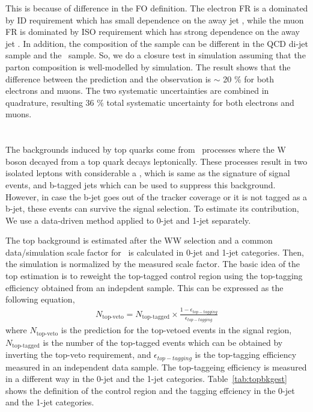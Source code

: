 This is because of difference in the FO definition. The electron FR is a
dominated by ID requirement which has small dependence on the away jet \pt, 
while the muon FR is dominated by ISO requirement which has strong dependence 
on the away jet \pt.
In addition, the composition of the sample can be different in the QCD di-jet sample 
and the \Wjets\ sample. So, we do a closure test in simulation 
assuming that the parton composition is well-modelled by simulation. 
The result shows that the difference between 
the prediction and the observation is $\sim$ 20 \% for both electrons and muons.
The two systematic uncertainties are combined in quadrature, resulting 
36 \% total systematic uncertainty for both electrons and muons. 
\section{ \topbkg }

The backgrounds induced by top quarks come from \topbkg\ processes where 
the W boson decayed from a top quark decays leptonically. These processes 
result in two isolated leptons with considerable a \met, which is 
same as the signature of signal events, and b-tagged jets which
can be used to suppress this background. However, in case the b-jet 
goes out of the tracker coverage or it is not tagged as a b-jet, 
these events can survive the signal selection. To estimate its 
contribution, We use a data-driven method applied to 0-jet and 1-jet separately.

The top background is estimated after the WW selection and a common 
data/simulation scale factor for \topbkg\ is calculated in 0-jet and 1-jet 
categories. Then, the simulation is normalized by the measured scale factor. 
The basic idea of the top estimation is to reweight the top-tagged control region 
using the top-tagging efficiency obtained from an indepdent sample. This 
can be expressed as the following equation, 
\begin{eqnarray} 
N_\textrm{top-veto} 
= 
N_{\textrm{top-tagged}} \times
\frac{1 - \epsilon_{top-tagging}}{\epsilon_{top-tagging}}   
\end{eqnarray} 
where $N_\textrm{top-veto}$ is the prediction for the top-vetoed events 
in the signal region, $N_{\textrm{top-tagged}}$ is the number of 
the top-tagged events which can be obtained by inverting the top-veto requirement, 
and $\epsilon_{top-tagging}$ is the top-tagging efficiency 
measured in an independent data sample. The top-taggeing efficiency 
is measured in a different way in the 0-jet and the 1-jet categories.
Table~\ref{tab:topbkgest} shows the definition of the control region 
and the tagging effciency in the 0-jet and the 1-jet categories.

